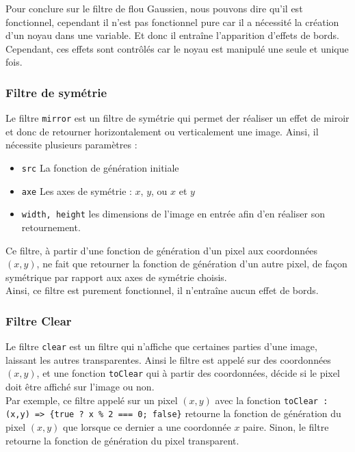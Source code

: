 \documentclass[11pt]{article}
\begin{document}
Pour conclure sur le filtre de flou Gaussien, nous pouvons dire qu'il est fonctionnel, cependant il n'est pas fonctionnel pure car il a nécessité la création d'un noyau dans une variable. Et donc il entraîne l'apparition d'effets de bords. Cependant, ces effets sont contrôlés car le noyau est manipulé une seule et unique fois.

\subsubsection{Filtre de symétrie}

Le filtre \texttt{mirror} est un filtre de symétrie qui permet der réaliser un effet de miroir et donc de retourner horizontalement ou verticalement une image. Ainsi, il nécessite plusieurs paramètres :
\begin{itemize}
    \item \texttt{src} La fonction de génération initiale
    \item \texttt{axe} Les axes de symétrie : $x$, $y$, ou $x$ et $y$
    \item \texttt{width, height} les dimensions de l'image en entrée afin d'en réaliser son retournement.
\end{itemize}

Ce filtre, à partir d'une fonction de génération d'un pixel aux coordonnées $(x,y)$, ne fait que retourner la fonction de génération d'un autre pixel, de façon symétrique par rapport aux axes de symétrie choisis. \\
Ainsi, ce filtre est purement fonctionnel, il n'entraîne aucun effet de bords.

\subsubsection{Filtre Clear}

Le filtre \texttt{clear} est un filtre qui n'affiche que certaines parties d'une image, laissant les autres transparentes. Ainsi le filtre est appelé sur des coordonnées $(x,y)$, et une fonction \texttt{toClear} qui à partir des coordonnées, décide si le pixel doit être affiché sur l'image ou non. \\

Par exemple, ce filtre appelé sur un pixel $(x,y)$ avec la fonction \texttt{toClear : (x,y) => \{true ? x \% 2 === 0; false\}} retourne la fonction de génération du pixel $(x,y)$ que lorsque ce dernier a une coordonnée $x$ paire. Sinon, le filtre retourne la fonction de génération du pixel transparent. \\
\end{document}
